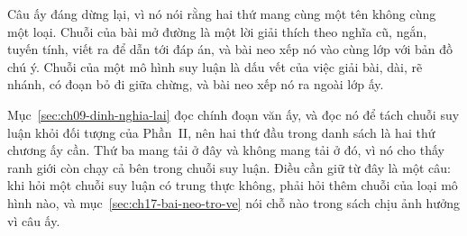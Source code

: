 Câu ấy đáng dừng lại, vì nó nói rằng hai thứ mang cùng một tên không cùng một
loại. Chuỗi của bài mở đường là một lời giải thích theo nghĩa cũ, ngắn, tuyến
tính, viết ra để dẫn tới đáp án, và bài neo xếp nó vào cùng lớp với bản đồ chú ý.
Chuỗi của một mô hình suy luận là dấu vết của việc giải bài, dài, rẽ nhánh, có
đoạn bỏ đi giữa chừng, và bài neo xếp nó ra ngoài lớp ấy.

%
Mục~\ref{sec:ch09-dinh-nghia-lai} đọc chính đoạn văn ấy, và đọc nó để tách chuỗi
suy luận khỏi đối tượng của Phần~II, nên hai thứ đầu trong danh sách là hai thứ
chương ấy cần. Thứ ba mang tải ở đây và không mang tải ở đó, vì nó cho thấy ranh
giới còn chạy cả bên trong chuỗi suy luận. Điều cần giữ từ đây là một câu: khi
hỏi một chuỗi suy luận có trung thực không, phải hỏi thêm chuỗi của loại mô hình
nào, và mục~\ref{sec:ch17-bai-neo-tro-ve} nói chỗ nào trong sách chịu ảnh hưởng
vì câu ấy.
